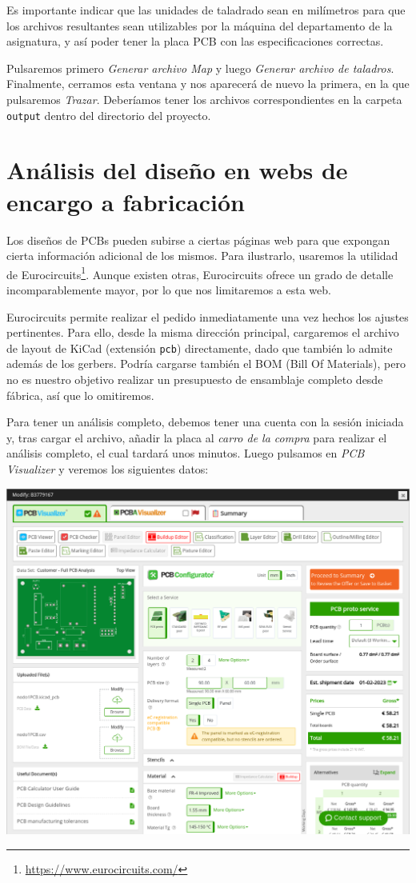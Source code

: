 Es importante indicar que las unidades de taladrado sean en milímetros para que
los archivos resultantes sean utilizables por la máquina del departamento de la
asignatura, y así poder tener la placa PCB con las especificaciones correctas.

Pulsaremos primero \emph{Generar archivo Map} y luego
\emph{Generar archivo de taladros}. Finalmente, cerramos esta ventana y nos
aparecerá de nuevo la primera, en la que pulsaremos \emph{Trazar}. Deberíamos
tener los archivos correspondientes en la carpeta \verb|output| dentro del
directorio del proyecto.

\section{Análisis del diseño en webs de encargo a fabricación}

Los diseños de PCBs pueden subirse a ciertas páginas web para que expongan
cierta información adicional de los mismos. Para ilustrarlo, usaremos la
utilidad de Eurocircuits\footnote{\url{https://www.eurocircuits.com/}}. Aunque
existen otras, Eurocircuits ofrece un grado de detalle incomparablemente mayor,
por lo que nos limitaremos a esta web.

Eurocircuits permite realizar el pedido inmediatamente una vez hechos los
ajustes pertinentes. Para ello, desde la misma dirección principal, cargaremos
el archivo de layout de KiCad (extensión \verb|pcb|) directamente, dado que
también lo admite además de los gerbers. Podría cargarse también el BOM (Bill
Of Materials), pero no es nuestro objetivo realizar un presupuesto de
ensamblaje completo desde fábrica, así que lo omitiremos.

Para tener un análisis completo, debemos tener una cuenta con la sesión
iniciada y, tras cargar el archivo, añadir la placa al
\emph{carro de la compra} para realizar el análisis completo, el cual tardará
unos minutos. Luego pulsamos en \emph{PCB Visualizer} y veremos los siguientes
datos:

\includegraphics[width=\linewidth]{eurocircuits-pcb-viewer-1.png}

